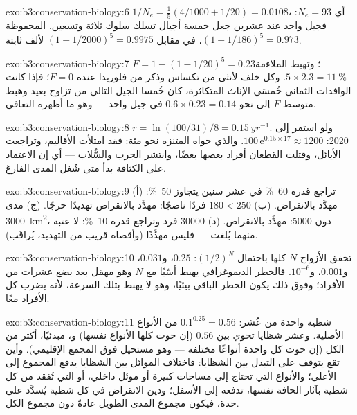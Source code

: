 \begin{solution}{exo:b3:conservation-biology:6}
$1/N_{e} = \tfrac{1}{5}(4/1000 + 1/20) = 0.0108$، أي $N_{e} = 93$: فجيل
واحد عند عشرين جعل خمسة أجيال تسلك سلوك ثلاثة وتسعين.
 المحفوظة $(1 - 1/186)^{5} = 0.973$، في مقابل $(1 -
1/2000)^{5} = 0.9975$ لألف ثابتة.
\end{solution}

\begin{solution}{exo:b3:conservation-biology:7}
$F = 1 - (1 - 1/20)^{5} = 0.23$؛ وتهبط الملاءمة $5\times 2.3 = \qty{11}{\%}$.
وكل خلف لأنثى من تكساس وذكر من فلوريدا عنده $F = 0$؛ فإذا كانت
الوافدات الثماني خُمسَي الإناث المتكاثرة، كان خُمسا
الجيل التالي من تزاوج بعيد وهبط متوسط $F$ إلى نحو
$0.6\times 0.23 = 0.14$ في جيل واحد --- وهو ما أظهره
التعافي.
\end{solution}

\begin{solution}{exo:b3:conservation-biology:8}
$r = \ln(100/31)/8 = \qty{0.15}{yr^{-1}}$. ولو استمر إلى 2020:
$100\,\mathrm{e}^{0.15\times 17} \approx 1200$. والذي حواه المتنزه نحو
مئة: فقد امتلأت الأقاليم، وتراجعت الأيائل، وقتلت القطعان أفراد
بعضها بعضًا، وانتشر الجرب والسُّلاب --- أي إن الاعتماد على الكثافة بدأ
متى شُغل المدى الفارغ.
\end{solution}

\begin{solution}{exo:b3:conservation-biology:9}
(أ) تراجع قدره \qty{60}{\%} في عشر سنين يتجاوز \qty{50}{\%}: مهدَّد بالانقراض.
(ب) $180 < 250$ فردًا ناضجًا: مهدَّد بالانقراض تهديدًا حرجًا. (ج) مدى
\qty{3000}{km^2}، دون \qty{5000}{}: مهدَّد بالانقراض. (د) \num{30000}
فرد وتراجع قدره \qty{10}{\%}: لا عتبة منهما بُلغت --- فليس
مهدَّدًا (وأقصاه قريب من التهديد، يُراقَب).
\end{solution}

\begin{solution}{exo:b3:conservation-biology:10}
تخفق الأزواج $N$ كلها باحتمال $(1/2)^{N}$: $0.25$، و$0.031$،
و$0.001$، و$10^{-6}$. فالخطر الديموغرافي يهبط أسّيًا مع $N$ وهو
مهمَل بعد بضع عشرات من الأفراد؛ وفوق ذلك يكون الخطر
الباقي بيئيًا، وهو لا يهبط بتلك السرعة، لأنه
يضرب كل الأفراد معًا.
\end{solution}

\begin{solution}{exo:b3:conservation-biology:11}
شظية واحدة من عُشر: $0.1^{0.25} = 0.56$ من الأنواع الأصلية.
وعشر شظايا تحوي بين $0.56$ (إن حوت كلها الأنواع نفسها) و،
مبدئيًا، أكثر من الكل (إن حوت كل واحدة أنواعًا مختلفة ---
وهو مستحيل فوق المجمع الإقليمي). وأين تقع يتوقف على
التبدل بين الشظايا: فاختلاف الموائل بين الشظايا
يدفع المجموع إلى الأعلى؛ والأنواع التي تحتاج إلى مساحات كبيرة أو موئل داخلي، أو التي
تُفقد من كل شظية بآثار الحافة نفسها، تدفعه إلى
الأسفل؛ ودين الانقراض في كل شظية يُسدَّد على حدة، فيكون
مجموع المدى الطويل عادةً دون مجموع الكل.
\end{solution}

